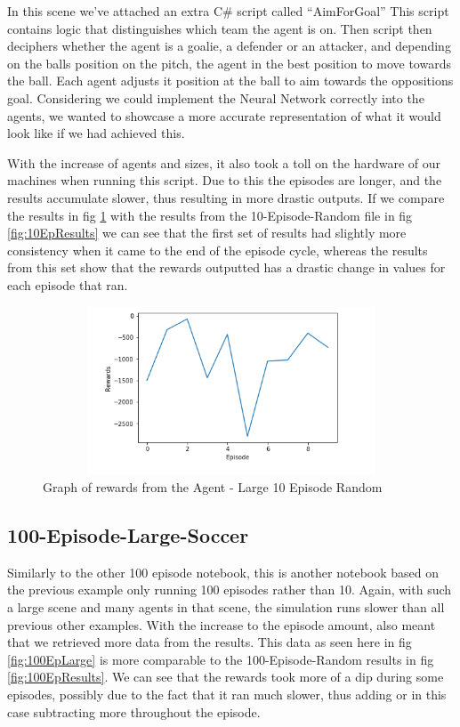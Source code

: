 \begin{itemize}
In this scene we’ve attached an extra C\# script called “AimForGoal” This script contains logic that distinguishes which team the agent is on. Then script then deciphers whether the agent is a goalie, a defender or an attacker, and depending on the balls position on the pitch, the agent in the best position to move towards the ball. Each agent adjusts it position at the ball to aim towards the oppositions goal. Considering we could implement the Neural Network correctly into the agents, we wanted to showcase a more accurate representation of what it would look like if we had achieved this. 

With the increase of agents and sizes, it also took a toll on the hardware of our machines when running this script. Due to this the episodes are longer, and the results accumulate slower, thus resulting in more drastic outputs. If we compare the results in fig \ref{fig:10EpLarge} with the results from the 10-Episode-Random file in fig \ref{fig:10EpResults} we can see that the first set of results had slightly more consistency when it came to the end of the episode cycle, whereas the results from this set show that the rewards outputted has a drastic change in values for each episode that ran. 

\begin{figure}[H]
    \centering
    \includegraphics[width=120mm, height=50mm]{img/Large10Episode.PNG}
    \caption{Graph of rewards from the Agent - Large 10 Episode Random}
    \label{fig:10EpLarge}
\end{figure}

\subsection{100-Episode-Large-Soccer}
Similarly to the other 100 episode notebook, this is another notebook based on the previous example only running 100 episodes rather than 10. Again, with such a large scene and many agents in that scene, the simulation runs slower than all previous other examples. With the increase to the episode amount, also meant that we retrieved more data from the results. This data as seen here in fig \ref{fig:100EpLarge} is more comparable to the 100-Episode-Random results in fig \ref{fig:100EpResults}. We can see that the rewards took more of a dip during some episodes, possibly due to the fact that it ran much slower, thus adding or in this case subtracting more throughout the episode.



\end{itemize}
